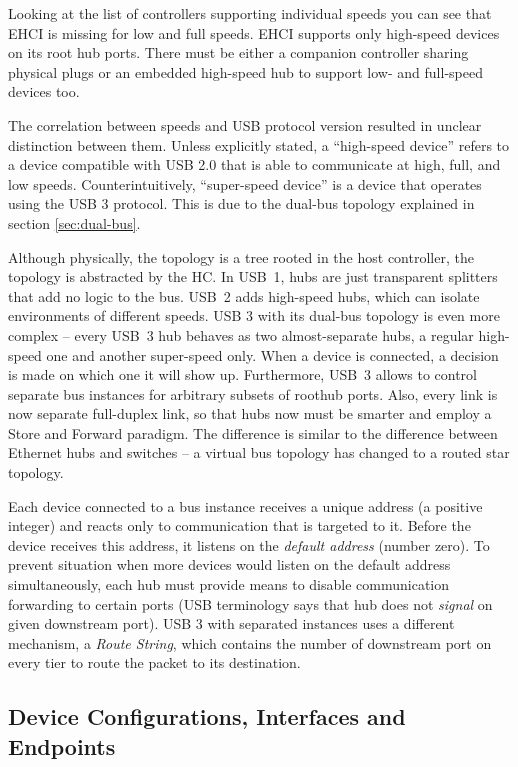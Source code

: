 Looking at the list of controllers supporting individual speeds you can see
that EHCI is missing for low and full speeds. EHCI supports only high-speed
devices on its root hub ports. There must be either a companion controller
sharing physical plugs or an embedded high-speed hub to support low- and
full-speed devices too.

The correlation between speeds and USB protocol version resulted in unclear
distinction between them. Unless explicitly stated, a ``high-speed device''
refers to a device compatible with USB 2.0 that is able to communicate at high,
full, and low speeds. Counterintuitively, ``super-speed device'' is a device
that operates using the USB 3 protocol. This is due to the dual-bus topology
explained in section \ref{sec:dual-bus}.

Although physically, the topology is a tree rooted in the host controller,
the topology is abstracted by the HC. In USB~1, hubs are just transparent
splitters that add no logic to the bus. USB~2 adds high-speed hubs, which can
isolate environments of different speeds. USB 3 with its dual-bus topology is
even more complex -- every USB~3 hub behaves as two almost-separate hubs,
a regular high-speed one and another super-speed only. When a device is
connected, a decision is made on which one it will show up. Furthermore, USB~3
allows to control separate bus instances for arbitrary subsets of roothub
ports. Also, every link is now separate full-duplex link, so that hubs now must
be smarter and employ a Store and Forward paradigm. The difference is similar
to the difference between Ethernet hubs and switches -- a virtual bus topology
has changed to a routed star topology.

Each device connected to a bus instance receives a unique address (a
positive integer) and reacts only to communication that is targeted to it.
Before the device receives this address, it listens on the \textit{default
address} (number zero). To prevent situation when more devices would listen on
the default address simultaneously, each hub must provide means to disable
communication forwarding to certain ports (USB terminology says that hub does
not \textit{signal} on given downstream port). USB 3 with separated instances
uses a different mechanism, a \emph{Route String}, which contains the number of
downstream port on every tier to route the packet to its destination.

\subsection{Device Configurations, Interfaces and Endpoints}

